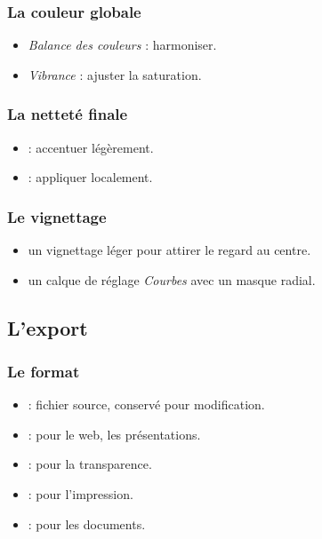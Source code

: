 \subsubsection{La couleur globale}

\begin{itemize}
    \item {} \emph{Balance des couleurs} : harmoniser.
    \item {} \emph{Vibrance} : ajuster la saturation.
\end{itemize}

\subsubsection{La netteté finale}

\begin{itemize}
    \item {} : accentuer légèrement.
    \item {} : appliquer localement.
\end{itemize}

\subsubsection{Le vignettage}

\begin{itemize}
    \item {} un vignettage léger pour attirer le regard au centre.
    \item {} un calque de réglage \emph{Courbes} avec un masque radial.
\end{itemize}

\subsection{L'export}

\subsubsection{Le format}

\begin{itemize}
    \item {} : fichier source, conservé pour modification.
    \item {} : pour le web, les présentations.
    \item {} : pour la transparence.
    \item {} : pour l'impression.
    \item {} : pour les documents.
\end{itemize}

